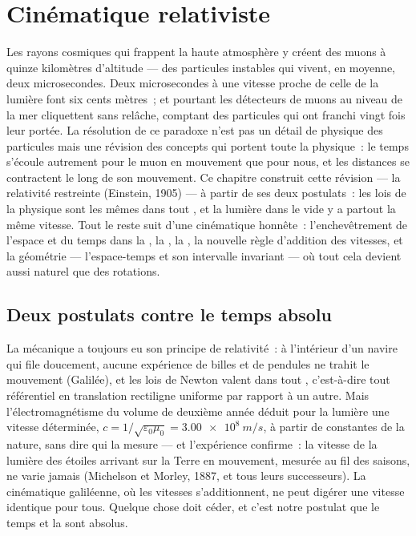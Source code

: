 \chapter{Cinématique relativiste}\label{ch:b3:relativistic-kinematics}

Les rayons cosmiques qui frappent la haute atmosphère y créent des
muons à quinze kilomètres d'altitude --- des particules instables qui
vivent, en moyenne, deux microsecondes. Deux microsecondes à une
vitesse proche de celle de la lumière font six cents mètres~; et
pourtant les détecteurs de muons au niveau de la mer cliquettent sans
relâche, comptant des particules qui ont franchi vingt fois leur
portée. La résolution de ce paradoxe n'est pas un détail de physique
des particules mais une révision des concepts qui portent toute la
physique~: le temps s'écoule autrement pour le muon en mouvement que
pour nous, et les distances se contractent le long de son mouvement.
Ce chapitre construit cette révision --- la relativité restreinte
(Einstein, 1905) --- à partir de ses deux postulats~: les lois de la
physique sont les mêmes dans tout , et la lumière
dans le vide y a partout la même vitesse. Tout le reste suit d'une
cinématique honnête~: l'enchevêtrement de l'espace et du temps dans la
, la , la , la nouvelle règle d'addition des vitesses, et la géométrie
--- l'espace-temps et son intervalle invariant --- où tout cela devient
aussi naturel que des rotations.

\section{Deux postulats contre le temps absolu}

\begin{remark}\label{rem:b3:relativistic-kinematics:conflict}
La mécanique a toujours eu son principe de relativité~: à l'intérieur
d'un navire qui file doucement, aucune expérience de billes et de
pendules ne trahit le mouvement (Galilée), et les lois de Newton valent
dans tout \emph{}, c'est-à-dire tout référentiel en
translation rectiligne uniforme par rapport à un autre. Mais
l'électromagnétisme du volume de deuxième année déduit pour la lumière une vitesse
déterminée, $c = 1/\sqrt{\varepsilon_0\mu_0} =
\qty{3.00e8}{m/s}$, à partir de constantes de la nature, sans dire qui
la mesure --- et l'expérience confirme~: la vitesse de la lumière des
étoiles arrivant sur la Terre en mouvement, mesurée au fil des saisons,
ne varie jamais (Michelson et Morley, 1887, et tous leurs successeurs).
La cinématique galiléenne, où les vitesses s'additionnent, ne peut
digérer une vitesse identique pour tous. Quelque chose doit céder, et
c'est notre postulat que le temps et la  sont absolus.
\end{remark}

